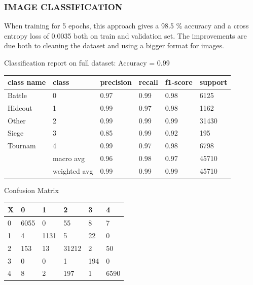 \documentclass[
]{article}
\begin{document}
\hypertarget{image-classification-1}{%
\subsubsection{IMAGE CLASSIFICATION}\label{image-classification-1}}

When training for 5 epochs, this approach gives a 98.5 \% accuracy and a
cross entropy loss of 0.0035 both on train and validation set. The
improvements are due both to cleaning the dataset and using a bigger
format for images.

Classification report on full dataset: Accuracy = 0.99

\begin{longtable}[]{@{}llllll@{}}
\toprule
class name & class & precision & recall & f1-score &
support\tabularnewline
\midrule
\endhead
Battle & 0 & 0.97 & 0.99 & 0.98 & 6125\tabularnewline
Hideout & 1 & 0.99 & 0.97 & 0.98 & 1162\tabularnewline
Other & 2 & 0.99 & 0.99 & 0.99 & 31430\tabularnewline
Siege & 3 & 0.85 & 0.99 & 0.92 & 195\tabularnewline
Tournam & 4 & 0.99 & 0.97 & 0.98 & 6798\tabularnewline
& macro avg & 0.96 & 0.98 & 0.97 & 45710\tabularnewline
& weighted avg & 0.99 & 0.99 & 0.99 & 45710\tabularnewline
\bottomrule
\end{longtable}

Confusion Matrix

\begin{longtable}[]{@{}llllll@{}}
\toprule
X & 0 & 1 & 2 & 3 & 4\tabularnewline
\midrule
\endhead
0 & 6055 & 0 & 55 & 8 & 7\tabularnewline
1 & 4 & 1131 & 5 & 22 & 0\tabularnewline
2 & 153 & 13 & 31212 & 2 & 50\tabularnewline
3 & 0 & 0 & 1 & 194 & 0\tabularnewline
4 & 8 & 2 & 197 & 1 & 6590\tabularnewline
\bottomrule
\end{longtable}
\end{document}

